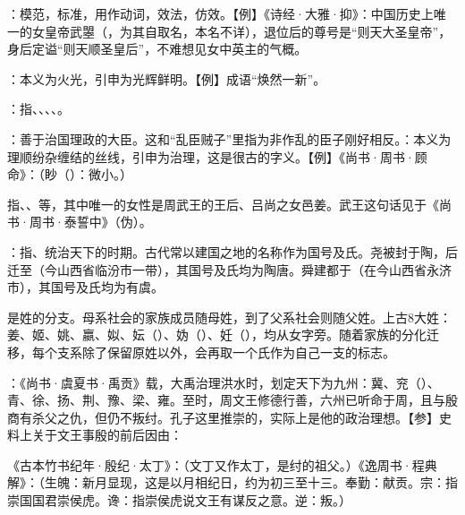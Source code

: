 {
\item {}：模范，标准，用作动词，效法，仿效。【例】《诗经·大雅·抑》：中国历史上唯一的女皇帝武曌（，为其自取名，本名不详），退位后的尊号是“则天大圣皇帝”，身后定谥“则天顺圣皇后”，不难想见女中英主的气概。
\item {}：本义为火光，引申为光辉鲜明。【例】成语“焕然一新”。
}
{}


{
\item {}：指、、、、。
\item {}：善于治国理政的大臣。这和“乱臣贼子”里指为非作乱的臣子刚好相反。：本义为理顺纷杂缠结的丝线，引申为治理，这是很古的字义。【例】《尚书·周书·顾命》：（眇（）：微小。）

指、、等，其中唯一的女性是周武王的王后、吕尚之女邑姜。武王这句话见于《尚书·周书·泰誓中》（伪）。

\item {}：指、统治天下的时期。古代常以建国之地的名称作为国号及氏。尧被封于陶，后迁至（今山西省临汾市一带），其国号及氏均为陶唐。舜建都于（在今山西省永济市），其国号及氏均为有虞。%

是姓的分支。母系社会的家族成员随母姓，到了父系社会则随父姓。上古8大姓：姜、姬、姚、嬴、姒、妘（）、妫（）、妊（），均从女字旁。随着家族的分化迁移，每个支系除了保留原姓以外，会再取一个氏作为自己一支的标志。

\item {}：《尚书·虞夏书·禹贡》载，大禹治理洪水时，划定天下为九州：冀、兖（）、青、徐、扬、荆、豫、梁、雍。至时，周文王修德行善，六州已听命于周，且与殷商有杀父之仇，但仍不叛纣。孔子这里推崇的，实际上是他的政治理想。【参】史料上关于文王事殷的前后因由：
\begin{lyenumerate}
\item 《古本竹书纪年·殷纪·太丁》：（文丁又作太丁，是纣的祖父。）《逸周书·程典解》：（生魄：新月显现，这是以月相纪日，约为初三至十三。奉勤：献贡。宗：指崇国国君崇侯虎。谗：指崇侯虎说文王有谋反之意。逆：叛。）


\end{lyenumerate}}

